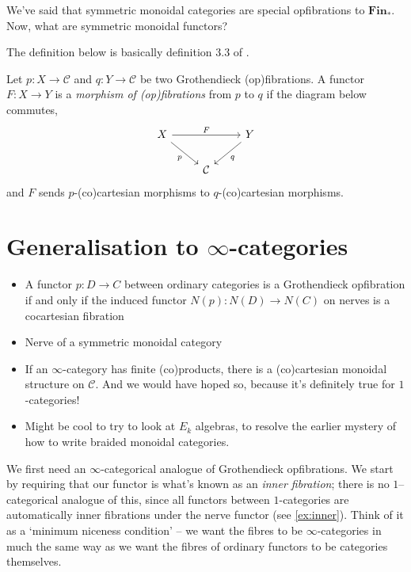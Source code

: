 \documentclass{MetricNotes2023}
\begin{document}
We've said that symmetric monoidal categories are special opfibrations to \(\textbf{Fin}_*\). Now, what are symmetric monoidal functors? 

The definition below is basically definition 3.3 of \autocite{symmetricmonoidal}.

\begin{definition}
Let \(p : X \to \mathcal{C}\) and \(q : Y \to \mathcal{C}\) be two Grothendieck (op)fibrations. A functor \(F : X \to Y\) is a \textit{morphism of (op)fibrations} from \(p\) to \(q\) if the diagram below commutes,
\[\begin{tikzcd}
X \arrow[rd, swap, "p"] \arrow[rr, "F"]  & & Y \arrow[ld, "q"]  \\
& \mathcal{C}  & 
\end{tikzcd}\]
and \(F\) sends \(p\)-(co)cartesian morphisms to \(q\)-(co)cartesian morphisms. 
\end{definition}

\section{Generalisation to \(\infty\)-categories}

\begin{itemize}
\item A functor \(p : D \to C\) between ordinary categories is a Grothendieck opfibration if and only if the induced functor \(N(p) : N(D) \to N(C)\) on nerves is a cocartesian fibration
\item Nerve of a symmetric monoidal category
\item If an \(\infty\)-category has finite (co)products, there is a (co)cartesian monoidal structure on \(\mathcal{C}\). And we would have hoped so, because it's definitely true for \(1\)-categories!
\item Might be cool to try to look at \(E_k\) algebras, to resolve the earlier mystery of how to write braided monoidal categories.
\end{itemize}

We first need an \(\infty\)-categorical analogue of Grothendieck opfibrations. We start by requiring that our functor is what's known as an \textit{inner fibration}; there is no \(1\)--categorical analogue of this, since all functors between \(1\)-categories are automatically inner fibrations under the nerve functor (see \ref{ex:inner}). Think of it as a `minimum niceness condition' -- we want the fibres to be \(\infty\)-categories in much the same way as we want the fibres of ordinary functors to be categories themselves. 
\end{document}

